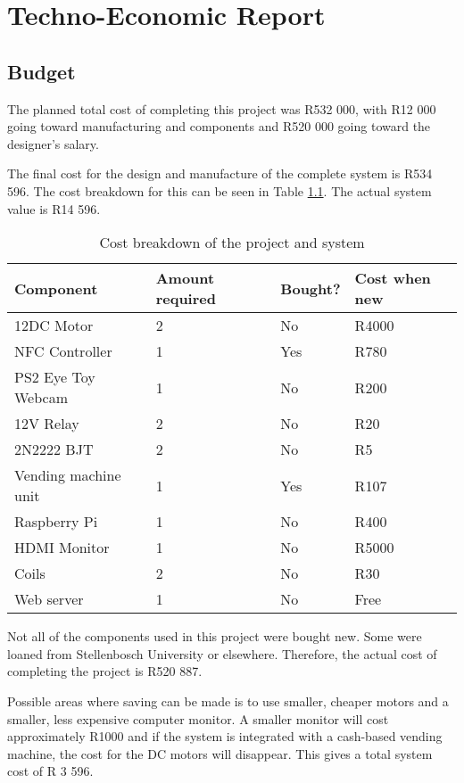 \chapter{Techno-Economic Report}
\label{app:techno-economic}

\section{Budget}

The planned total cost of completing this project was R532 000, with R12 000 going toward
manufacturing and components and R520 000 going toward the designer's salary.

The final cost for the design and manufacture of the complete system is R534 596. The cost
breakdown for this can be seen in Table \ref{tab:cost-breakdown}. The actual system value
is R14 596.

\begin{table}
\caption{Cost breakdown of the project and system}
\label{tab:cost-breakdown}
\centering
\begin{tabular}{|l|l|l|l|}
  \hline
  \textbf{Component} & \textbf{Amount required} & \textbf{Bought?} & \textbf{Cost when
  new} \\\hline\hline 
  12DC Motor & 2 & No & R4000 \\\hline
  NFC Controller & 1 & Yes & R780 \\\hline
  PS2 Eye Toy Webcam & 1 & No & R200 \\\hline
  12V Relay & 2 & No & R20 \\\hline
  2N2222 BJT & 2 & No & R5 \\\hline
  Vending machine unit & 1 & Yes & R107 \\\hline
  Raspberry Pi & 1 & No & R400 \\\hline
  HDMI Monitor & 1 & No & R5000 \\\hline
  Coils & 2 & No & R30 \\\hline
  Web server & 1 & No & Free \\\hline
\end{tabular}
\end{table}

Not all of the components used in this project were bought new. Some were loaned from
Stellenbosch University or elsewhere. Therefore, the actual cost of completing the project
is R520 887. 

Possible areas where saving can be made is to use smaller, cheaper motors and a smaller,
less expensive computer monitor. A smaller monitor will cost approximately R1000 and if
the system is integrated with a cash-based vending machine, the cost for the DC motors
will disappear. This gives a total system cost of R 3 596.

